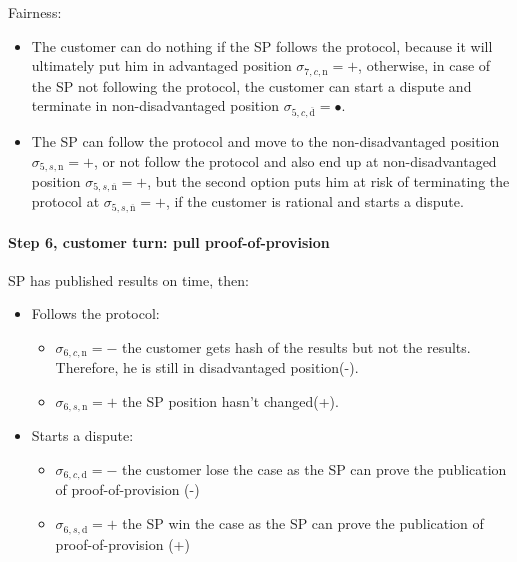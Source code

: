 \documentclass{ieeeaccess}
\begin{document}
Fairness:

\begin{itemize}

\item
  The customer can do nothing if the SP follows the protocol, because it
  will ultimately put him in advantaged position
  \(\sigma_{7, c, \mathrm{n}} = +\), otherwise, in case of the SP not
  following the protocol, the customer can start a dispute and terminate
  in non-disadvantaged position
  \(\sigma_{5, c, \overline{\mathrm{d}}} = •\).
\item
  The SP can follow the protocol and move to the non-disadvantaged
  position \(\sigma_{5, s, \mathrm{n}} = +\), or not follow the protocol
  and also end up at non-disadvantaged position
  \(\sigma_{5, s, \overline{\mathrm{n}}} = +\), but the second option
  puts him at risk of terminating the protocol at
  \(\sigma_{5, s, \overline{\mathrm{n}}} = +\), if the customer is
  rational and starts a dispute.
\end{itemize}


\paragraph{Step 6, customer turn: pull
proof-of-provision}\label{step-6-pull-proof-of-provision}

SP has published results on time, then:

\begin{itemize}
\item
  Follows the protocol:

  \begin{itemize}
  
  \item
    \(\sigma_{6, c, \mathrm{n}} = -\) the customer gets hash of the
    results but not the results. Therefore, he is still in disadvantaged
    position(-).
  \item
    \(\sigma_{6, s, \mathrm{n}} = +\) the SP position hasn't changed(+).
  \end{itemize}
\item
  Starts a dispute:

  \begin{itemize}
  
  \item
    \(\sigma_{6, c, \mathrm{d}} = -\) the customer lose the case as the
    SP can prove the publication of proof-of-provision (-)
  \item
    \(\sigma_{6, s, \mathrm{d}} = +\) the SP win the case as the SP can
    prove the publication of proof-of-provision (+)
  \end{itemize}
\end{itemize}
\end{document}
